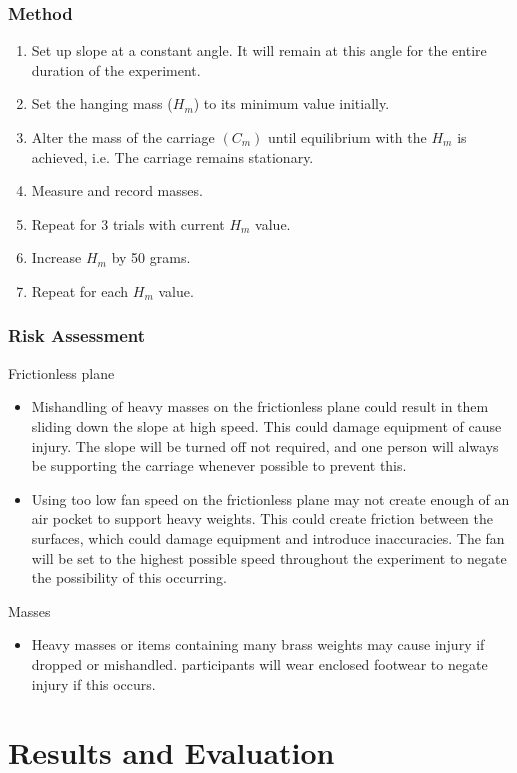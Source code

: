 \documentclass[11pt,a4paper]{article}
\begin{document}
\subsubsection{Method}
\begin{enumerate}
\item Set up slope at a constant angle. It will remain at this angle for the entire duration of the experiment. 
\item Set the hanging mass ($H_m$) to its minimum value initially.
\item Alter the mass of the carriage $(C_m)$ until equilibrium with the $H_m$ is achieved, i.e. The carriage remains stationary. 
\item Measure and record masses. 
\item Repeat for 3 trials with current $H_m$ value.
\item Increase $H_m$ by 50 grams. 
\item Repeat for each $H_m$ value.
\end{enumerate}


\subsubsection{Risk Assessment}
Frictionless plane
\begin{itemize}
	\item Mishandling of heavy masses on the frictionless plane could result in them sliding down the slope at high speed. This could damage equipment of cause injury. The slope will be turned off not required, and one person will always be supporting the carriage whenever possible to prevent this. 
	\item Using too low fan speed on the frictionless plane may not create enough of an air pocket to support heavy weights. This could create friction between the surfaces, which could damage equipment and introduce inaccuracies. The fan will be set to the highest possible speed throughout the experiment to negate the possibility of this occurring.
\end{itemize}
Masses
\begin{itemize}
	\item Heavy masses or items containing many brass weights may cause injury if dropped or mishandled. participants will wear enclosed footwear to negate injury if this occurs.  
\end{itemize}
\section{Results and Evaluation}
\end{document}
